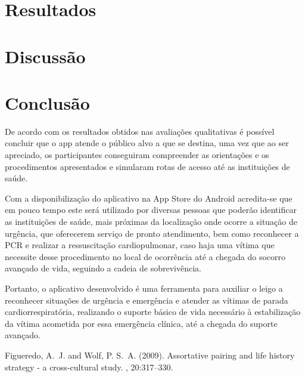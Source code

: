 \documentclass[twoside,twocolumn]{article}
\begin{document}
\section{Resultados}





\section{Discussão}






\section{Conclusão}


De acordo com os resultados obtidos nas avaliações qualitativas é possível concluir que o app atende o público alvo a que se destina, uma vez que ao ser apreciado, os participantes conseguiram compreender as orientações e os procedimentos apresentados e simularam rotas de acesso até as instituições de saúde.

Com a disponibilização do aplicativo na App Store do Android acredita-se que em pouco tempo  este será utilizado por diversas pessoas que poderão identificar as instituições de saúde, mais  próximas da localização onde ocorre a situação de urgência, que oferecerem serviço de pronto atendimento, bem como reconhecer a PCR e realizar a ressuscitação cardiopulmonar, caso haja  uma vítima que necessite desse procedimento no local de ocorrência até a chegada do socorro  avançado de vida, seguindo a cadeia de sobrevivência.

Portanto, o aplicativo desenvolvido é uma ferramenta para auxiliar o leigo a reconhecer situações de urgência e emergência e atender as vítimas de parada cardiorrespiratória, realizando o suporte básico de vida necessário à estabilização da vítima acometida por essa emergência clínica, até a chegada do suporte avançado.



\begin{thebibliography}{99} %

Figueredo, A.~J. and Wolf, P. S.~A. (2009).
\newblock Assortative pairing and life history strategy - a cross-cultural
  study.
, 20:317--330.
 
\end{thebibliography}

\end{document}
